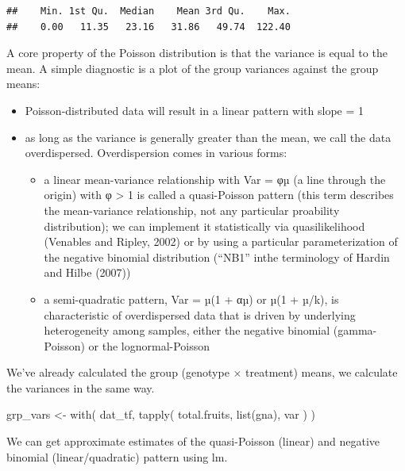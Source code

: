 \documentclass[
  12pt,
]{book}
\newenvironment{Shaded}{\begin{snugshade}}{\end{snugshade}}
\newcommand{\FunctionTok}[1]{\textcolor[rgb]{0.00,0.00,0.00}{#1}}
\newcommand{\NormalTok}[1]{#1}
\newcommand{\OtherTok}[1]{\textcolor[rgb]{0.56,0.35,0.01}{#1}}
\providecommand{\tightlist}{%
  \setlength{\itemsep}{0pt}\setlength{\parskip}{0pt}}
\begin{document}
\begin{verbatim}
##    Min. 1st Qu.  Median    Mean 3rd Qu.    Max. 
##    0.00   11.35   23.16   31.86   49.74  122.40
\end{verbatim}

A core property of the Poisson distribution is that the variance is equal to the mean. A simple diagnostic is a plot of the group variances against the group means:

\begin{itemize}
\tightlist
\item
  Poisson-distributed data will result in a linear pattern with slope = 1
\item
  as long as the variance is generally greater than the mean, we call the data overdispersed. Overdispersion comes in various forms:

  \begin{itemize}
  \tightlist
  \item
    a linear mean-variance relationship with Var = φµ (a line through the origin) with φ \textgreater{} 1 is called a quasi-Poisson pattern (this term describes the mean-variance relationship, not any particular proability distribution); we can implement it statistically via quasilikelihood (Venables and Ripley, 2002) or by using a particular parameterization of the negative binomial distribution (``NB1'' inthe terminology of Hardin and Hilbe (2007))
  \item
    a semi-quadratic pattern, Var = µ(1 + αµ) or µ(1 + µ/k), is characteristic of overdispersed data that is driven by underlying heterogeneity among samples, either the negative binomial (gamma-Poisson) or the lognormal-Poisson \citep{elston2001}
  \end{itemize}
\end{itemize}

We've already calculated the group (genotype × treatment) means, we calculate the variances in the same way.

\begin{Shaded}
\begin{Highlighting}[]
\NormalTok{grp\_vars }\OtherTok{\textless{}{-}} \FunctionTok{with}\NormalTok{(}
\NormalTok{  dat\_tf,}
  \FunctionTok{tapply}\NormalTok{(}
\NormalTok{    total.fruits,}
    \FunctionTok{list}\NormalTok{(gna), var}
\NormalTok{  )}
\NormalTok{)}
\end{Highlighting}
\end{Shaded}

We can get approximate estimates of the quasi-Poisson (linear) and negative binomial (linear/quadratic) pattern using lm.
\end{document}
